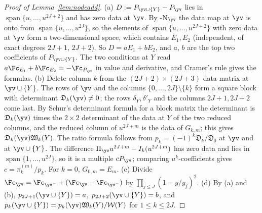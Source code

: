 \begin{proof}[Proof of Lemma~\textup{\ref{lem:nodeadd}}]
(a) $D:=P_{\yv\cup\{Y\}}-P_{\yv}$ lies in $\operatorname{span}\{u,\dots,u^{2J+2}\}$ and has zero data at $\yv$. By
\hyp{N}$_{\yv}$ the data map at $\yv$ is onto from $\operatorname{span}\{u,\dots,u^{2J}\}$, so the elements of
$\operatorname{span}\{u,\dots,u^{2J+2}\}$ with zero data at $\yv$ form a two-dimensional space, which contains
$E_1,E_2$ (independent, of exact degrees $2J+1$, $2J+2$). So $D=aE_1+bE_2$, and $a$, $b$ are the top two
coefficients of $P_{\yv\cup\{Y\}}$. The two conditions at $Y$ read
$a\Fc_{E_1}+b\Fc_{E_2}=-\Fc_{P_{\yv}}$ in value and derivative, and Cramer's rule gives the formulas.
(b) Delete column $k$ from the $(2J+2)\times(2J+3)$ data matrix at $\yv\cup\{Y\}$. The rows of $\yv$ and the
columns $\{0,\dots,2J\}\setminus\{k\}$ form a square block with determinant $\mathfrak D_k(\yv)\ne0$; the rows
$\delta_Y,\delta'_Y$ and the columns $2J+1,2J+2$ come last. By Schur's determinant formula for a block matrix
\cite[Ch.~II, \S5, formula~(I), p.~46]{Gan59} the determinant is
$\mathfrak D_k(\yv)$ times the $2\times2$ determinant of the data at $Y$ of the two reduced columns, and the reduced
column of $u^{2J+m}$ is the data of $G_{k,m}$; this gives $\mathfrak D_k(\yv)\mathfrak W_k(Y)$. The ratio
formula follows from $p_k=(-1)^k\mathfrak D_k/\mathfrak D_0$ at $\yv$ and at $\yv\cup\{Y\}$. The difference
$\Pi_{\yv}u^{2J+m}-I_k(u^{2J+m})$ has zero data and lies in $\operatorname{span}\{1,\dots,u^{2J}\}$, so it is a multiple
$cP_{\yv}$; comparing $u^k$-coefficients gives $c=\pi^{(m)}_k/p_k$. For $k=0$, $G_{0,m}=E_m$.
(c) Divide $\Fc_{\yv}=\Fc_{\yv^-}+(\Fc_{\yv}-\Fc_{\yv^-})$ by $\prod_{j\le J}(1-y/y_j)^2$.
(d) By (a) and (b), $p_{2J+1}(\yv\cup\{Y\})=a$, $p_{2J+2}(\yv\cup\{Y\})=b$, and
$p_k(\yv\cup\{Y\})=p_k(\yv)\mathfrak W_k(Y)/\mathcal W(Y)$ for $1\le k\le2J$.
\end{proof}

